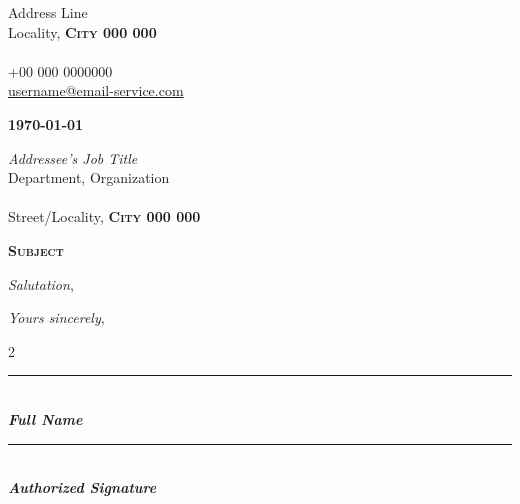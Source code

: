 \documentclass[twoside]{letter}
\begin{document}
\justifying

\parbox{\linewidth}
{
\begin{flushright}
Address Line\\

Locality, \textbf{\textsc{City 000 000}}\\
\mbox{}\\
+00 000 0000000\\
\href{mailto:username@email-service.com}{username@email-service.com}
\end{flushright}
}

\textbf{\today}

\parbox{\linewidth}
{
\begin{flushleft}
\emph{Addressee's Job Title}\\
Department, Organization\\
\mbox{}\\
Street/Locality, \textbf{\textsc{City 000 000}}\\
\end{flushleft}
}

\vspace{2em}

\begin{center}\textsc{\Large \textbf{Subject}}\end{center}


\emph{Salutation},

\lipsum[1-2]

\bigskip

\emph{Yours sincerely},

\vfill

\begin{multicols}{2}
    \parbox{\linewidth}
    {
    \begin{flushleft}
        \rule{0.90\linewidth}{0.5mm}\\
        \textbf{\emph{Full Name}}    
    \end{flushleft}
    }

    \parbox{\linewidth}
    {
    \begin{flushright}
        \rule{0.90\linewidth}{0.5mm}\\
        \textbf{\emph{Authorized Signature}}
    \end{flushright}
    }
\end{multicols}
\end{document}
